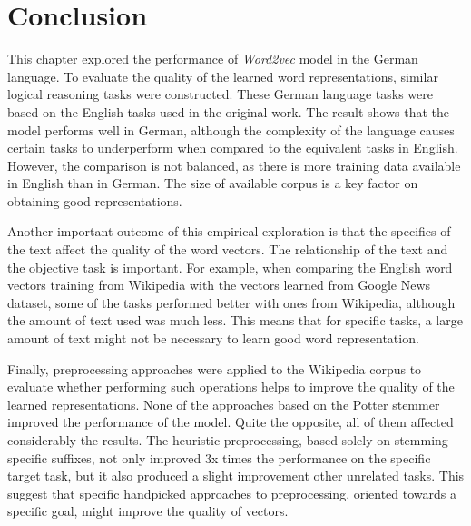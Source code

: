 


\section{Conclusion}
\label{sec:conclusion_and_future_work}   

This chapter explored the performance of \textit{Word2vec} model in the German
language. To evaluate the quality of the learned  word representations,  similar
logical reasoning tasks were constructed. These German language tasks were
based on the English tasks used in the original work. 
The result shows that the model performs well in German, although the complexity of the
language causes certain tasks to underperform when compared to the equivalent
tasks in English. However, the comparison is not  balanced, as there is more
training data available in English than in German. The size of available corpus is a key factor on obtaining good representations.

Another important outcome of this  empirical exploration is that the specifics
of the text affect the quality of the word vectors. The
relationship of the text and the objective task is important.  For example,
when comparing the English word vectors training from  Wikipedia with the
vectors learned from  Google News dataset, some of the tasks performed better
with ones from Wikipedia,  although the amount of text used was  much less.
This means that for specific tasks, a large amount of text might not be
necessary to learn  good word representation.

Finally,  preprocessing approaches were applied to the Wikipedia
corpus to evaluate whether performing such operations  helps to improve the quality of
the learned representations. None  of the  approaches based on the Potter
stemmer improved the
performance of the model. Quite the opposite, all of them affected
considerably the results.
The heuristic preprocessing, based solely on stemming specific suffixes,  not
only improved  3x times the performance on the specific target task, 
but it also produced a slight improvement other unrelated tasks. This suggest that specific
handpicked approaches to preprocessing, oriented towards a specific goal,  might improve  the quality of
vectors.

